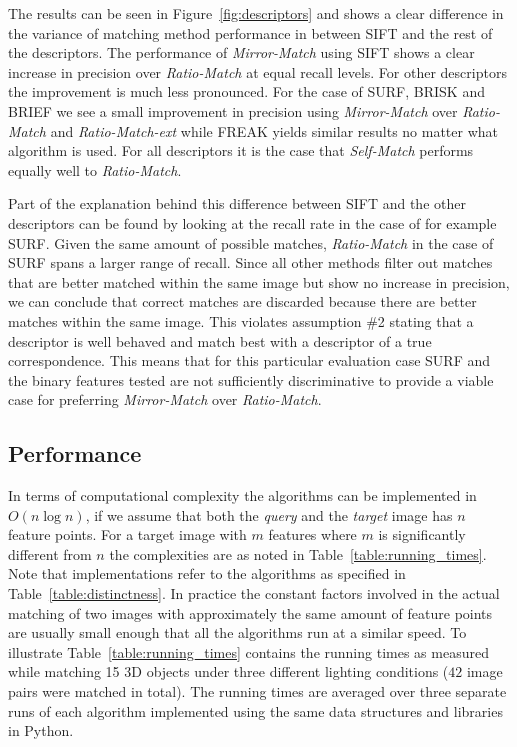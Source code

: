 \documentclass[journal]{IEEEtran}
\begin{document}
The results can be seen in Figure~\ref{fig:descriptors} and shows a 
clear difference in the variance of matching method performance in 
between SIFT and the rest of the descriptors. The performance of 
\emph{Mirror-Match} using SIFT shows a clear increase in precision over 
\emph{Ratio-Match} at equal recall levels. For other descriptors the 
improvement is much less pronounced.  For the case of SURF, BRISK and 
BRIEF we see a small improvement in precision using \emph{Mirror-Match} 
over \emph{Ratio-Match} and \emph{Ratio-Match-ext} while FREAK yields 
similar results no matter what algorithm is used. For all descriptors it 
is the case that \emph{Self-Match} performs equally well to 
\emph{Ratio-Match}.

Part of the explanation behind this difference between SIFT and the 
other descriptors can be found by looking at the recall rate in the case
of for example SURF\@. Given the same amount of possible matches, 
\emph{Ratio-Match} in the case of SURF spans a larger range of recall.  
Since all other methods filter out matches that are better matched 
within the same image but show no increase in precision, we can conclude 
that correct matches are discarded because there are better matches 
within the same image. This violates assumption \#2 stating that a 
descriptor is well behaved and match best with a descriptor of a true 
correspondence. This means that for this particular evaluation case SURF 
and the binary features tested are not sufficiently discriminative to 
provide a viable case for preferring \emph{Mirror-Match} over 
\emph{Ratio-Match}.

\subsection{Performance}

In terms of computational complexity the algorithms can be implemented 
in $O(n\log n)$, if we assume that both the \emph{query} and the 
\emph{target} image has $n$ feature points. For a target image with $m$ 
features where $m$ is significantly different from $n$ the complexities 
are as noted in Table~\ref{table:running_times}. Note that 
implementations refer to the algorithms as specified in 
Table~\ref{table:distinctness}. In practice the constant factors 
involved in the actual matching of two images with approximately the 
same amount of feature points are usually small enough that all the 
algorithms run at a similar speed. To illustrate 
Table~\ref{table:running_times} contains the running times as measured 
while matching 15 3D objects under three different lighting conditions 
($42$ image pairs were matched in total). The running times are averaged 
over three separate runs of each algorithm implemented using the same 
data structures and libraries in Python. 
\end{document}
